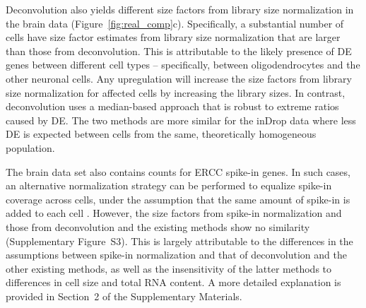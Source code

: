 \documentclass{bmcart}
\newcommand{\suppspikesec}{2}
\newcommand{\suppspikefig}{S3}
\begin{document}

Deconvolution also yields different size factors from library size normalization in the brain data (Figure~\ref{fig:real_comp}c).
Specifically, a substantial number of cells have size factor estimates from library size normalization that are larger than those from deconvolution.
This is attributable to the likely presence of DE genes between different cell types -- specifically, between oligodendrocytes and the other neuronal cells.
Any upregulation will increase the size factors from library size normalization for affected cells by increasing the library sizes.
In contrast, deconvolution uses a median-based approach that is robust to extreme ratios caused by DE.
The two methods are more similar for the inDrop data where less DE is expected between cells from the same, theoretically homogeneous population.

The brain data set also contains counts for ERCC spike-in genes.
In such cases, an alternative normalization strategy can be performed to equalize spike-in coverage across cells, 
    under the assumption that the same amount of spike-in is added to each cell \cite{stegle2015computational}.
However, the size factors from spike-in normalization and those from deconvolution and the existing methods show no similarity (Supplementary Figure~\suppspikefig{}).
This is largely attributable to the differences in the assumptions between spike-in normalization and that of deconvolution and the other existing methods,
    as well as the insensitivity of the latter methods to differences in cell size and total RNA content.
A more detailed explanation is provided in Section~\suppspikesec{} of the Supplementary Materials.
\end{document}
